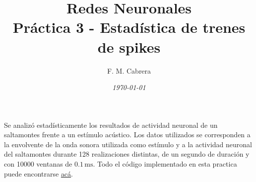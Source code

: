 \documentclass[11pt,a4paper]{article}
\title{\textbf{Redes Neuronales \\ Práctica 3 - Estadística de trenes de spikes}}
\author{
{F. M. Cabrera}
}
\date{\textit{\today}}
\newcommand{\rojo}[1]{\textcolor{red}{#1}}    %
\begin{document}
\maketitle



\setcounter{page}{1}




Se analizó estadísticamente los resultados de actividad neuronal de un saltamontes frente a un estímulo acústico. Los datos utilizados se corresponden a la envolvente de la onda sonora utilizada como estímulo y a la actividad neuronal del saltamontes durante 128 realizaciones distintas, de un segundo de duración y con 10000 ventanas de $0.1\,\text{ms}$. Todo el código implementado en esta practica puede encontrarse \href{https://github.com/cabre94/Redes_Neuronales_IB}{acá}.









% 
% 
\end{document}
